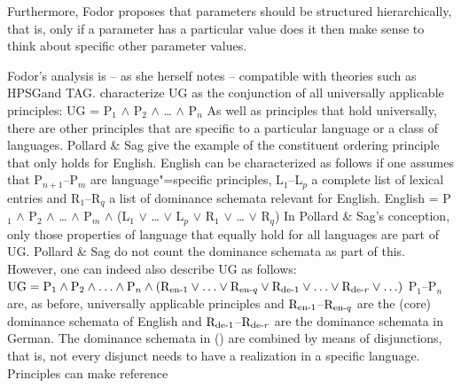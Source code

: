 Furthermore, Fodor proposes that parameters should be structured hierarchically, that is, only if a parameter has a particular value
does it then make sense to think about specific other parameter values.

Fodor's analysis is -- as she herself notes \citep[]{Fodor2001a} -- compatible with theories such as HPSG\indexhpsg and TAG\indextag.
\citet[]{ps} characterize UG as the conjunction of all universally applicable principles:
\ea
UG = P$_1$ $\wedge$ P$_2$ $\wedge$ \ldots{} $\wedge$ P$_n$
\z
As well as principles that hold universally, there are other principles that are specific to a particular language
or a class of languages. Pollard \& Sag give the example of the constituent ordering principle that only holds for English.
English can be characterized as follows if one assumes that P$_{n + 1}$--P$_m$ are language"=specific principles,  
L$_{1}$--L$_p$ a complete list of lexical entries and R$_{1}$--R$_q$ a list of dominance schemata relevant for English.
\ea
English = P$_1$ $\wedge$ P$_2$ $\wedge$ \ldots{} $\wedge$ P$_m$ $\wedge$ (L$_{1}$ $\vee$ \ldots{}
$\vee$ L$_p$ $\vee$ R$_{1}$ $\vee$ \ldots{} $\vee$  R$_q$)
\z
In Pollard \& Sag's conception, only those properties of language that equally hold for all languages are
part of UG. Pollard \& Sag do not count the dominance schemata as part of this. However, one can indeed also describe
UG as follows:
\ea
$
\text{UG} = 
  \text{P}_1 
  \wedge 
  \text{P}_2 
  \wedge 
  \ldots 
  \wedge 
  \text{P}_n 
  \wedge
              (\text{R}_{\text{en}\text{\normalfont -}1} 
              \vee 
              \ldots 
              \vee 
              \text{R}_{\text{en}\text{\normalfont -} q} 
              \vee  
              \text{R}_{\text{de}\text{\normalfont -}1} 
              \vee 
              \ldots 
              \vee 
              \text{R}_{\text{de}\text{\normalfont -} r}
	      \vee 
	      \ldots)
$
\z
\largerpage
P$_1$--P$_n$ are, as before, universally applicable principles and
$\text{R}_{\text{en}\text{\normalfont -}1}$--$\text{R}_{\text{en}\text{\normalfont -} q}$ are the
(core) dominance schemata of English and $\text{R}_{\text{de}\text{\normalfont -}1}$--$\text{R}_{\text{de}\text{\normalfont -} r}$ are the dominance schemata in
German. The dominance schemata in () are combined by means of disjunctions, that is, not every disjunct needs to have a realization in a specific language. Principles can make reference
